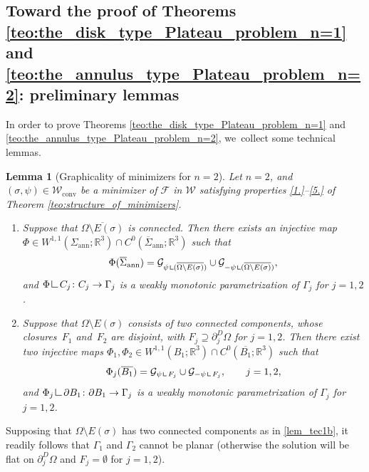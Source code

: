 \documentclass[11pt]{article}
\numberwithin{equation}{section}
\newcommand{\R}{\mathbb{R}}
\newcommand{\admclass}{\mathcal W}
\let\Om\Omega
\newcommand\admclassconv{{\mathcal W_\mathrm{conv}}}
\newcommand{\openannulus}{\Sigma_\mathrm{ann}}
\newcommand{\immclosedann}{\Phi({\overline\Sigma}_\mathrm{ann})}
\newcommand{\resa}{\mathop{\hbox{\vrule height 7pt width 0.5pt depth 0pt
\vrule height 0.5pt width 6pt depth 0pt}}\nolimits}
\newcommand{\resb}{\mathop{\hbox{\vrule height 4pt width 0.5pt depth 0pt
\vrule height 0.5pt width 3pt depth 0pt}}\nolimits}
\newcommand{\res}{\mathchoice{\resa}{\resa}{\resb}{\resb}}
\newtheorem{lemma}[theorem]{Lemma}
\theoremstyle{definition}
\begin{document}
\subsection{Toward the proof of Theorems \ref{teo:the_disk_type_Plateau_problem_n=1}
and \ref{teo:the_annulus_type_Plateau_problem_n=2}: preliminary lemmas}

In order to prove Theorems \ref{teo:the_disk_type_Plateau_problem_n=1} and
\ref{teo:the_annulus_type_Plateau_problem_n=2}, we~collect some technical lemmas.

\begin{lemma}[Graphicality of minimizers for $n=2$]\label{lem_tec1}
Let $n=2$, and $(\sigma,\psi)\in\admclassconv$ be a minimizer
of $\mathcal F$ in
$\admclass$
satisfying properties \ref{1.}--\ref{5.} of Theorem \ref{teo:structure_of_minimizers}.
\begin{enumerate}[{\rm(a)},wide]
\item\label{lem_tec1a}
Suppose that $\overline{\Om\setminus E(\sigma)}$ is connected.
Then there exists an injective map $\Phi\in W^{1,1}(\openannulus;\R^3)\cap C^0(\overline{\Sigma}_{\mathrm{ann}};\R^3)$ such that
\[
\immclosedann=\mathcal G_{\psi\res (\overline{\Om\setminus E(\sigma)})}\cup\mathcal G_{-\psi\res (\overline{\Om\setminus E(\sigma)})},
\]
and $\Phi\res C_j\colon C_j\to \Gamma_j$ is a weakly monotonic parametrization of $\Gamma_j$ for $j=1,2$.
\item\label{lem_tec1b}
Suppose that $\Om\setminus E(\sigma)$
consists of two connected components, whose closures~$F_1$ and~$F_2$ are disjoint,
with
$F_j \supseteq \partial^D_j\Om$ for $j=1,2$.
Then there exist two injective maps $\Phi_1,\Phi_2\in W^{1,1}(B_1;\R^3)\cap C^0(\overline{B_1};\R^3)$ such that
\[
\Phi_j(\overline{B_1})=\mathcal G_{\psi\res {F_j}}
\cup\mathcal G_{-\psi\res{F_j}},\qquad j=1,2,
\]
and $\Phi_j\res \partial B_1\colon\partial B_1\to \Gamma_j$ is a weakly monotonic parametrization of $\Gamma_j$ for $j=1,2$.
\end{enumerate}
\end{lemma}
Supposing that $\Om\setminus E(\sigma)$
has two connected components as in \ref{lem_tec1b}, it readily follows that $\Gamma_1$
and $\Gamma_2$
cannot be planar
(otherwise the solution will be flat on $\partial^D_j\Om$ and $F_j=\emptyset$
for $j=1,2$).
\end{document}
